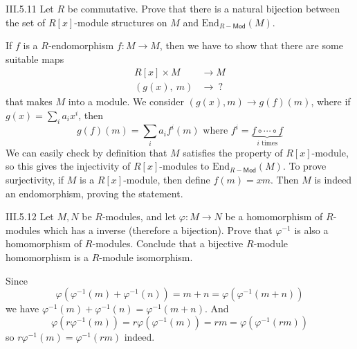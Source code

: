 \begin{problem}{III.5.11}
Let $R$ be commutative. Prove that there is a natural bijection between the set of $R[x]$-module structures on $M$ and $\text{End}_{R-\textsf{Mod}}(M)$.
\end{problem}
\begin{pf}
If $f$ is a $R$-endomorphism $f:M \to M$, then we have to show that there are some suitable maps
\begin{align*}
    R[x] \times M &\to M \\
    (g(x), \:m) &\to \: ?
\end{align*}
that makes $M$ into a module. We consider $(g(x),m) \to g(f)(m)$, where if $g(x) = \sum_i a_i x^i$, then
\[
g(f)(m) = \sum_{i} a_i f^i(m) \text{ where } f^i = \underbrace{f \circ \cdots \circ f}_{i\text{ times}}
\]
We can easily check by definition that $M$ satisfies the property of $R[x]$-module, so this gives the injectivity of $R[x]$-modules to $\text{End}_{R-\textsf{Mod}}(M)$. To prove surjectivity, if $M$ is a $R[x]$-module, then define $f(m) = xm$. Then $M$ is indeed an endomorphism, proving the statement.
\end{pf}

\begin{problem}{III.5.12}
Let $M,N$ be $R$-modules, and let $\varphi:M \to N$ be a homomorphism of $R$-modules which has a inverse (therefore a bijection). Prove that $\varphi^{-1}$ is also a homomorphism of $R$-modules. Conclude that a bijective $R$-module homomorphism is a $R$-module isomorphism.
\end{problem}
\begin{pf}
Since
\[
\varphi(\varphi^{-1}(m) + \varphi^{-1}(n)) = m + n = \varphi(\varphi^{-1}(m + n))
\]
we have $\varphi^{-1}(m) + \varphi^{-1}(n) = \varphi^{-1}(m + n)$. And
\[
\varphi(r\varphi^{-1}(m)) = r\varphi(\varphi^{-1}(m)) = rm = \varphi(\varphi^{-1}(rm))
\]
so $r\varphi^{-1}(m) = \varphi^{-1}(rm)$ indeed. 
\end{pf}
